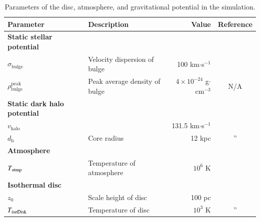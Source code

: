 \documentclass[twocolumn]{aastex631}
\begin{document}
\begin{table}[t]
\raggedright
\caption{Parameters of the disc, atmosphere, and gravitational potential in the simulation.}
\label{table-parameters}
\begin{tabular}{@{}llrc@{}}
\toprule[1pt]\midrule[0.3pt]
Parameter                             & Description                               & Value                                &  Reference                     \\ \midrule
{\bf Static stellar potential }       &                                           &                                      &                                \\
$\sigma_{\text{bulge}}$               & Velocity dispersion of bulge              & 100 km$\cdot$s$^{-1}$                & \citep{velocity-dispersion-MW} \\
$\rho_{\text{bulge}}^{\text{peak}}$   & Peak average density of bulge             & $4\times 10^{-24}$ g$\cdot$cm$^{-3}$ &   N/A                          \\ \hline
{\bf Static dark halo potential }     &                                           &                                      &                                \\
$v_{\text{halo}}$                     &                                           & 131.5 km$\cdot$s$^{-1}$              & \citep{Johnston1995}           \\
$d_{\text{h}}$                        & Core radius                               & 12 kpc                               & \multicolumn{1}{c}{''}         \\ \hline
{\bf Atmosphere }                     &                                           &                                      &                                \\
$T_{\text{\text{atmp}}}$              & Temperature of atmosphere                 & $10^{6}$ K                           & \citep{temperature-MW}         \\ \hline
{\bf Isothermal disc }                &                                           &                                      &                                \\
$z_{0}$                               & Scale height of disc                      & 100 pc                               & \citep{peak-ism-density}       \\
$T_{\text{\text{isoDisk}}}$           & Temperature of disc                       & $10^{3}$ K                           & \multicolumn{1}{c}{''}         \\

\end{tabular}
\end{table}
\end{document}
